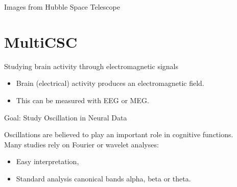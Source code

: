 \documentclass{beamer}
\def\keypoint#1{\hspace{0pt plus 1 filll}\textcolor{gray}{#1}}
\def\mycite#1{\keypoint{\small\citep{#1}}}
\begin{document}
\begin{frame}{Images from Hubble Space Telescope}

{\centering
}
\end{frame}

\section{MultiCSC}



\begin{frame}{Studying brain activity through electromagnetic signals}
\begin{itemize}
    \item Brain (electrical) activity produces an electromagnetic field.
    \item This can be measured with EEG or MEG.
\end{itemize}

\end{frame}

\begin{frame}{Goal: Study Oscillation in Neural Data}

\textbf{}Oscillations are believed to play an important role in cognitive functions.\\[3em]
Many studies rely on Fourier or wavelet analyses:\\[.5em]
\begin{itemize}\itemsep1em
\item Easy interpretation,
\item Standard analysis \eg{} canonical bands alpha, beta or theta.\\\mycite{buzsaki2006rhythms}
\end{itemize}

\end{frame}
\end{document}
